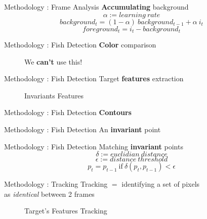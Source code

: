 \documentclass{beamer}
\begin{document}
\begin{frame}[c]{Methodology : Frame Analysis}
\center \textbf{Accumulating} background\\

$$
\alpha := learning\ rate
$$
$$
background_t = (1-\alpha)\ background_{t-1} + \alpha\ i_t
$$
$$
foreground_t = i_t - background_t
$$

\end{frame}


\begin{frame}[c]{Methodology : Fish Detection}
\center \textbf{Color} comparison\\
\begin{figure}[hbtp]
\centering
\pause
\center We \textbf{can't} use this!
\end{figure}
\end{frame}

\begin{frame}[c]{Methodology : Fish Detection}
\center Target \textbf{features} extraction\\
\begin{figure}[hbtp]
\centering
\caption{Invariants Features}
\end{figure}
\end{frame}

\begin{frame}[c]{Methodology : Fish Detection}
\center \textbf{Contours} \\
\begin{figure}[hbtp]
\centering
\end{figure}
\end{frame}

\begin{frame}[c]{Methodology : Fish Detection}
\center An \textbf{invariant} point \\
\begin{figure}[hbtp]
\centering
\end{figure}
\end{frame}


\begin{frame}[c]{Methodology : Fish Detection}
\center Matching \textbf{invariant} points \\

$$
\delta := euclidian\ distance
$$
$$
\epsilon := distance\ threshold
$$
$$
p_t = p_{t-1}\ \text{if}\ \delta(p_t, p_{t-1}) < \epsilon
$$

\end{frame}


\begin{frame}[c]{Methodology : Tracking}
\center Tracking $=$ identifying a set of pixels \\as \textit{identical} between 2 frames\\
\begin{figure}[hbtp]
\centering
\caption{Target's Features Tracking}
\end{figure}
\end{frame}
\end{document}
